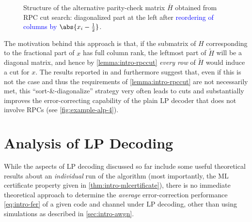 \begin{figure}
  \centering
  \caption{Structure of the alternative parity-check matrix $\bar H$ obtained from RPC cut search: \textcolor{Lime!20!Black}{diagonalized part} at the left after \textcolor{Blue}{reordering of columns by $\abs{x_i-\frac 12}$}.}
  \label{fig:rpc-matrix}
\end{figure}
The motivation behind this approach is that, if the submatrix of $H$ corresponding to the fractional part of $x$ has full column rank, the leftmost part of $\tilde H$ will be a diagonal matrix, and hence by \cref{lemma:intro-rpccut} \emph{every row} of $\tilde H$ would induce a cut for $x$. The results reported in \cite{Tanatmis+10SeparationAlgorithm} and \cite{ZhangSiegel11AdaptiveCut} furthermore suggest that, even if this is not the case and thus the requirements of \cref{lemma:intro-rpccut} are not necessarily met, this \enquote{sort-\&-diagonalize} strategy very often leads to cuts and substantially improves the error-correcting capability of the plain LP decoder that does not involve RPCs (see \cref{fig:example-alp-4}).

\section{Analysis of LP Decoding}
\label{sec:intro-lp-analysis}
While the aspects of LP decoding discussed so far include some useful theoretical results about an \emph{individual} run of the algorithm (most importantly, the ML certificate property given in \cref{thm:intro-mlcertificate}), there is no immediate theoretical approach to determine the \emph{average} error-correction performance \cref{eq:intro-fer} of a given code and channel under LP decoding, other than using simulations as described in \cref{sec:intro-awgn}.

